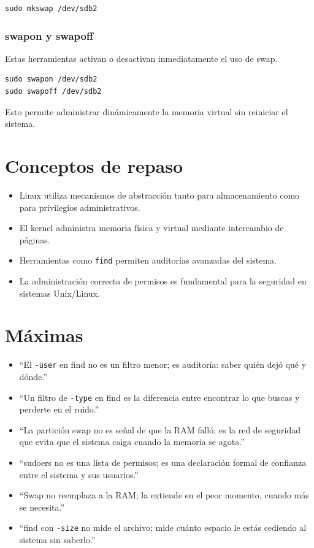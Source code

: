 \documentclass[11pt, letterpaper]{article}
\begin{document}
\begin{verbatim}
sudo mkswap /dev/sdb2
\end{verbatim}
\subsubsection{swapon y swapoff}
\label{sec:org73aaa6f}

Estas herramientas activan o desactivan inmediatamente el uso de swap.

\begin{verbatim}
sudo swapon /dev/sdb2
sudo swapoff /dev/sdb2
\end{verbatim}

Esto permite administrar dinámicamente la memoria virtual sin reiniciar el sistema.
\section{Conceptos de repaso}
\label{sec:org8e45e32}

\begin{itemize}
\item Linux utiliza mecanismos de abstracción tanto para almacenamiento como para privilegios administrativos.
\item El kernel administra memoria física y virtual mediante intercambio de páginas.
\item Herramientas como \texttt{find} permiten auditorías avanzadas del sistema.
\item La administración correcta de permisos es fundamental para la seguridad en sistemas Unix/Linux.
\end{itemize}
\section{Máximas}
\label{sec:org2551d56}

\begin{itemize}
\item “El \texttt{-user} en find no es un filtro menor; es auditoría: saber quién dejó qué y dónde.”
\item “Un filtro de \texttt{-type} en find es la diferencia entre encontrar lo que buscas y perderte en el ruido.”
\item “La partición swap no es señal de que la RAM falló; es la red de seguridad que evita que el sistema caiga cuando la memoria se agota.”
\item “sudoers no es una lista de permisos; es una declaración formal de confianza entre el sistema y sus usuarios.”
\item “Swap no reemplaza a la RAM; la extiende en el peor momento, cuando más se necesita.”
\item “find con \texttt{-size} no mide el archivo; mide cuánto espacio le estás cediendo al sistema sin saberlo.”
\end{itemize}
\end{document}
